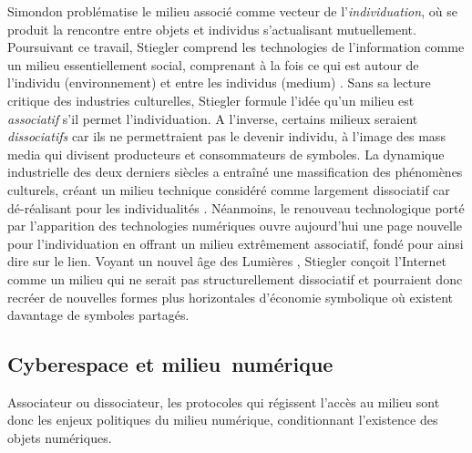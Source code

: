 Simondon problématise le milieu associé comme vecteur de l’\textit{individuation}, où se produit la rencontre entre objets et individus s'actualisant mutuellement. Poursuivant ce travail, Stiegler comprend les technologies de l’information comme un milieu essentiellement social, comprenant à la fois ce qui est autour de l’individu (environnement) et entre les individus (medium) \citep{Stiegler1998a}. Sans sa lecture critique des industries culturelles, Stiegler formule l’idée qu’un milieu est \textit{associatif} s’il permet l’individuation. A l’inverse, certains milieux seraient \textit{dissociatifs} car ils ne permettraient pas le devenir individu, à l’image des mass media qui divisent producteurs et consommateurs de symboles. La dynamique industrielle des deux derniers siècles a entraîné une massification des phénomènes culturels, créant un milieu technique considéré comme largement dissociatif car dé-réalisant pour les individualités \citep{Simondon1989}. Néanmoins, le renouveau technologique porté par l’apparition des technologies numériques ouvre aujourd’hui une page nouvelle pour l’individuation en offrant un milieu extrêmement associatif, fondé pour ainsi dire sur le lien. Voyant un nouvel âge des Lumières \citep{Stiegler2012}, Stiegler conçoit l’Internet comme un milieu qui ne serait pas structurellement dissociatif et pourraient donc recréer de nouvelles formes plus horizontales d’économie symbolique où existent davantage de symboles partagés. 

\subsection[Cyberespace et milieu numérique]{Cyberespace et milieu numérique}

Associateur ou dissociateur, les protocoles qui régissent l’accès au milieu sont donc les enjeux politiques du milieu numérique, conditionnant l’existence des objets numériques. 

